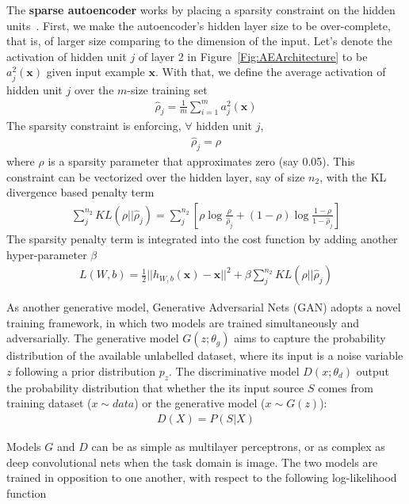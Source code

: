 The \textbf{sparse autoencoder} works by placing a sparsity constraint on the hidden units~\cite{SparseAE}.
First, we make the autoencoder's hidden layer size to be over-complete,
that is, of larger size comparing to the dimension of the input.
Let's denote the activation of hidden unit $j$ of layer 2 in Figure~\ref{Fig:AEArchitecture}
to be $a^2_j(\mathbf{x})$ given input example $\mathbf{x}$.
With that, we define the average activation of hidden unit $j$ over the $m$-size
training set
\begin{align}
    \hat{\rho}_j = \frac{1}{m} \sum_{i=1}^{m} a^2_j(\mathbf{x})
\end{align}
The sparsity constraint is enforcing, $\forall$ hidden unit $j$,
\begin{align}
    \hat{\rho}_j = \rho
\end{align}
where $\rho$ is a sparsity parameter that approximates zero (say 0.05).
This constraint can be vectorized over the hidden layer, say of size $n_2$,
with the KL divergence based penalty term
\begin{align}
    \sum_j^{n_2} KL(\rho || \hat{\rho}_j)
    = \sum_j^{n_2} [\rho \log \frac{\rho}{\hat{\rho}_j} + (1 - \rho) \log \frac{1-\rho}{1-\hat{\rho}_j} ]
\end{align}
The sparsity penalty term is integrated into the cost function by adding another hyper-parameter $\beta$
\begin{align}
    L(W, b) = \frac{1}{2}||h_{W,b}(\mathbf{x}) - \mathbf{x}||^2 +
    \beta \sum_j^{n_2} KL(\rho || \hat{\rho}_j)
\end{align}
\fi

\iffalse
{}
As another generative model, Generative Adversarial Nets (GAN)\cite{GAN} adopts a novel training framework,
in which two models are trained simultaneously and adversarially.
The generative model $G(z;\theta_g)$ aims to capture the probability distribution of the available unlabelled dataset,
where its input is a noise variable $z$ following a prior distribution $p_z$.
The discriminative model $D(x;\theta_d)$ output the probability distribution that whether the its input source $S$ comes
from training dataset ($x\sim data$) or the generative model ($x \sim G(z)$):
\begin{align}
    D(X) = P(S|X)
\end{align}

Models $G$ and $D$ can be as simple as multilayer perceptrons,
or as complex as deep convolutional nets when the task domain is image.
The two models are trained in opposition to one another, with respect to the following log-likelihood function

